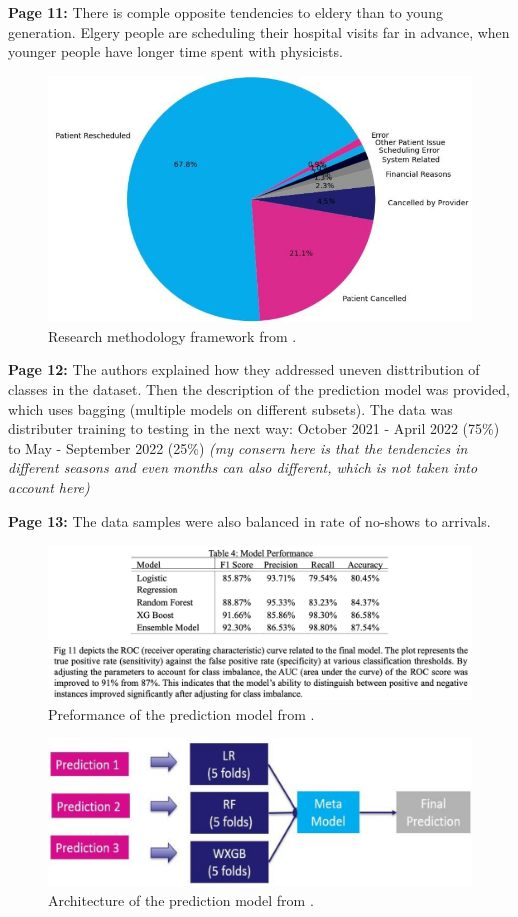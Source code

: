     \textbf{Page 11:}
    There is comple opposite tendencies to eldery than to young generation. Elgery people are scheduling their hospital visits far in advance, when younger people have longer time spent with physicists.
    \begin{figure}[H]
        \centering
        \includegraphics[width=.8\textwidth]{figures/SM0006US23/fig2.png}
        \caption{Research methodology framework from \cite{x147}.}
        \label{fig2:SM0006US23}
    \end{figure}

    \textbf{Page 12:}
    The authors explained how they addressed uneven disttribution of classes in the dataset. Then the description of the prediction model was provided, which uses bagging (multiple models on different subsets). The data was distributer training to testing in the next way: October 2021 - April 2022 (75\%) to May - September 2022 (25\%) \textit{(my consern here is that the tendencies in different seasons and even months can also different, which is not taken into account here)}

    \textbf{Page 13:}
    The data samples were also balanced in rate of no-shows to arrivals.
    \begin{figure}[H]
        \centering
        \includegraphics[width=1\textwidth]{figures/SM0006US23/fig4.png}
        \caption{Preformance of the prediction model from \cite{x147}.}
        \label{fig4:SM0006US23}
    \end{figure}
    \begin{figure}[H]
        \centering
        \includegraphics[width=.8\textwidth]{figures/SM0006US23/fig3.png}
        \caption{Architecture of the prediction model from \cite{x147}.}
        \label{fig3:SM0006US23}
    \end{figure}
    
